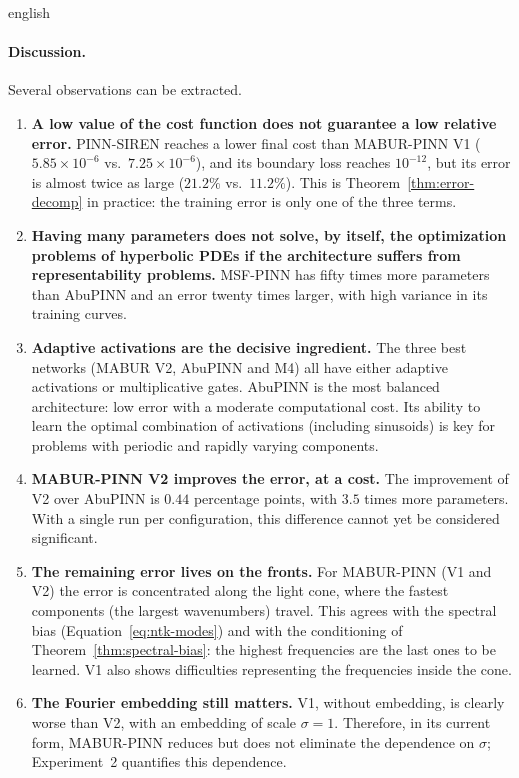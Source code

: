 \documentclass[../0000.tex]{subfiles}
\begin{document}
\begin{hyphenrules}{english}
\paragraph{Discussion.}
Several observations can be extracted.
\begin{enumerate}
  \item \textbf{A low value of the cost function does not guarantee a low relative error.} PINN-SIREN
    reaches a lower final cost than MABUR-PINN V1 ($5.85\times10^{-6}$ vs.\ $7.25\times10^{-6}$), and its
    boundary loss reaches $10^{-12}$, but its error is almost twice as large ($21.2\%$ vs.\ $11.2\%$).
    This is Theorem~\ref{thm:error-decomp} in practice: the training error is only one of the three terms.
  \item \textbf{Having many parameters does not solve, by itself, the optimization problems of hyperbolic
    PDEs if the architecture suffers from representability problems.} MSF-PINN has fifty times more
    parameters than AbuPINN and an error twenty times larger, with high variance in its training curves.
  \item \textbf{Adaptive activations are the decisive ingredient.} The three best networks (MABUR V2,
    AbuPINN and M4) all have either adaptive activations or multiplicative gates. AbuPINN is the most
    balanced architecture: low error with a moderate computational cost. Its ability to learn the optimal
    combination of activations (including sinusoids) is key for problems with periodic and rapidly
    varying components.
  \item \textbf{MABUR-PINN V2 improves the error, at a cost.} The improvement of V2 over AbuPINN is
    $0.44$ percentage points, with $3.5$ times more parameters. With a single run per configuration, this
    difference cannot yet be considered significant.
  \item \textbf{The remaining error lives on the fronts.} For MABUR-PINN (V1 and V2) the error is
    concentrated along the light cone, where the fastest components (the largest wavenumbers) travel. This
    agrees with the spectral bias (Equation~\eqref{eq:ntk-modes}) and with the conditioning of
    Theorem~\ref{thm:spectral-bias}: the highest frequencies are the last ones to be learned. V1 also shows
    difficulties representing the frequencies inside the cone.
  \item \textbf{The Fourier embedding still matters.} V1, without embedding, is clearly worse than V2,
    with an embedding of scale $\sigma=1$. Therefore, in its current form, MABUR-PINN reduces but does not
    eliminate the dependence on $\sigma$; Experiment~2 quantifies this dependence.
\end{enumerate}


\end{hyphenrules}
\end{document}
